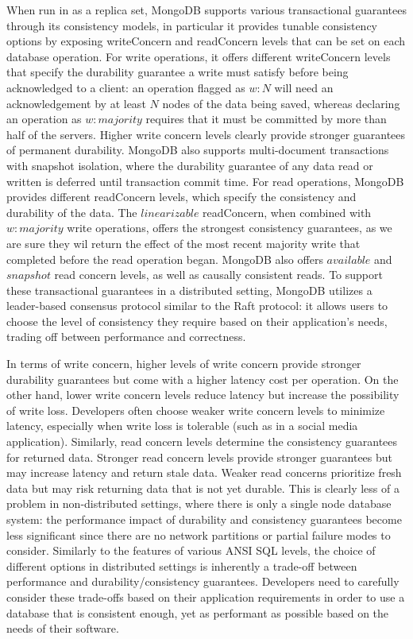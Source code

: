 When run in as a replica set, MongoDB supports various transactional guarantees through its consistency models, in particular it provides tunable consistency options by exposing writeConcern and readConcern levels that can be set on each database operation.
For write operations, it offers different writeConcern levels that specify the durability guarantee a write must satisfy before being acknowledged to a client: an operation flagged as $w:N$ will need an acknowledgement by at least $N$ nodes of the data being saved, whereas declaring an operation as $w:majority$ requires that it must be committed by more than half of the servers. Higher write concern levels clearly provide stronger guarantees of permanent durability. MongoDB also supports multi-document transactions with snapshot isolation, where the durability guarantee of any data read or written is deferred until transaction commit time.
For read operations, MongoDB provides different readConcern levels, which specify the consistency and durability of the data. The $linearizable$ readConcern, when combined with $w:majority$ write operations, offers the strongest consistency guarantees, as we are sure they wil return the effect of the most recent majority write that completed before the read operation began. MongoDB also offers $available$ and $snapshot$ read concern levels, as well as causally consistent reads.
To support these transactional guarantees in a distributed setting, MongoDB utilizes a leader-based consensus protocol similar to the Raft protocol: it allows users to choose the level of consistency they require based on their application's needs, trading off between performance and correctness.

In terms of write concern, higher levels of write concern provide stronger durability guarantees but come with a higher latency cost per operation. On the other hand, lower write concern levels reduce latency but increase the possibility of write loss. Developers often choose weaker write concern levels to minimize latency, especially when write loss is tolerable (such as in a social media application). Similarly, read concern levels determine the consistency guarantees for returned data. Stronger read concern levels provide stronger guarantees but may increase latency and return stale data. Weaker read concerns prioritize fresh data but may risk returning data that is not yet durable. This is clearly less of a problem in non-distributed settings, where there is only a single node database system: the performance impact of durability and consistency guarantees become less significant since there are no network partitions or partial failure modes to consider. Similarly to the features of various ANSI SQL levels, the choice of different options in distributed settings is inherently a trade-off between performance and durability/consistency guarantees. Developers need to carefully consider these trade-offs based on their application requirements in order to use a database that is consistent enough, yet as performant as possible based on the needs of their software.